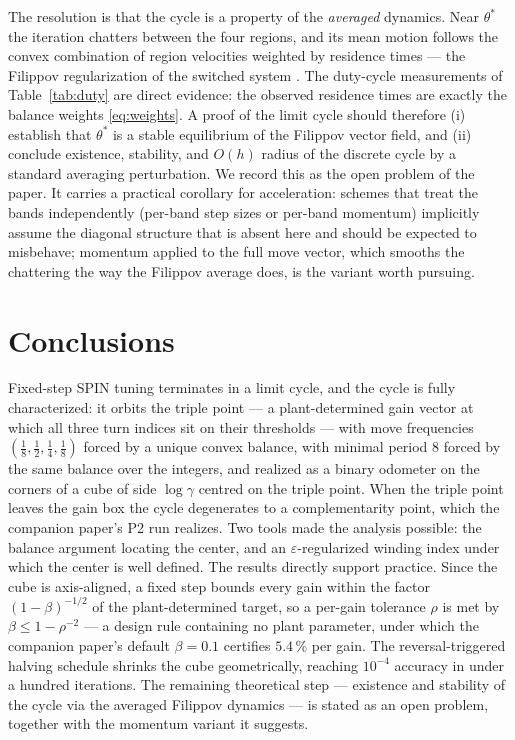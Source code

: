 \documentclass[letterpaper, 10pt, conference, twocolumn]{ieeeconf}
\begin{document}
The resolution is that the cycle is a property of the \emph{averaged}
dynamics. Near $\theta^*$ the iteration chatters between the four regions, and
its mean motion follows the convex combination of region velocities weighted
by residence times --- the Filippov regularization of the switched system
\cite{Filippov1988}. The duty-cycle measurements of Table~\ref{tab:duty} are
direct evidence: the observed residence times are exactly the balance weights
\eqref{eq:weights}. A proof of the limit cycle should therefore (i) establish
that $\theta^*$ is a stable equilibrium of the Filippov vector field, and
(ii) conclude existence, stability, and $O(h)$ radius of the discrete cycle by
a standard averaging perturbation. We record this as the open problem of the
paper. It carries a practical corollary for acceleration: schemes that treat
the bands independently (per-band step sizes or per-band momentum) implicitly
assume the diagonal structure that is absent here and should be expected to
misbehave; momentum applied to the full move vector, which smooths the
chattering the way the Filippov average does, is the variant worth pursuing.

\section{Conclusions}

Fixed-step SPIN tuning terminates in a limit cycle, and the cycle is fully
characterized: it orbits the triple point --- a plant-determined gain vector at
which all three turn indices sit on their thresholds --- with move frequencies
$(\tfrac18, \tfrac12, \tfrac14, \tfrac18)$ forced by a unique convex balance,
with minimal period $8$ forced by the same balance over the integers, and
realized as a binary odometer on the corners of a cube of side
$\log\gamma$ centred on the triple point. When the
triple point leaves the gain box the cycle degenerates to a complementarity
point, which the companion paper's P2 run realizes. Two tools made the
analysis possible: the balance argument locating the center, and an
$\varepsilon$-regularized winding index under which the center is well
defined. The results directly support practice. Since the cube is
axis-aligned, a fixed step bounds every gain within the factor
$(1-\beta)^{-1/2}$ of the plant-determined target, so a per-gain tolerance
$\rho$ is met by $\beta \le 1-\rho^{-2}$ --- a design rule containing no plant
parameter, under which the companion paper's default $\beta = 0.1$
certifies $5.4\,\%$ per gain. The reversal-triggered halving
schedule shrinks the cube geometrically, reaching $10^{-4}$ accuracy in under
a hundred iterations. The remaining theoretical
step --- existence and stability of the cycle via the averaged Filippov
dynamics --- is stated as an open problem, together with the momentum variant
it suggests.
\end{document}
